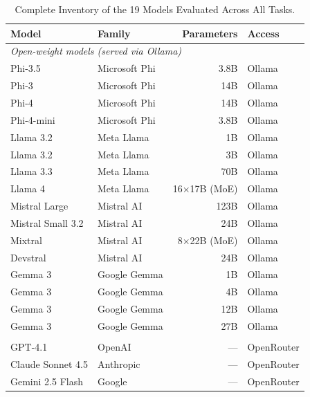 \begin{table}[htbp]
    \centering
    \caption{Complete Inventory of the 19 Models Evaluated Across All Tasks.}
    \label{tab:model_inventory}
    \footnotesize
    \begin{tabular}{llrl}
    \hline
    \textbf{Model} & \textbf{Family} & \textbf{Parameters} & \textbf{Access} \\
    \hline
    \multicolumn{4}{l}{\textit{Open-weight models (served via Ollama)}} \\
    \addlinespace[0.3em]
    Phi-3.5        & Microsoft Phi   & 3.8B         & Ollama \\
    Phi-3          & Microsoft Phi   & 14B          & Ollama \\
    Phi-4          & Microsoft Phi   & 14B          & Ollama \\
    Phi-4-mini     & Microsoft Phi   & 3.8B         & Ollama \\
    Llama 3.2      & Meta Llama      & 1B           & Ollama \\
    Llama 3.2      & Meta Llama      & 3B           & Ollama \\
    Llama 3.3      & Meta Llama      & 70B          & Ollama \\
    Llama 4        & Meta Llama      & 16$\times$17B (MoE) & Ollama \\
    Mistral Large  & Mistral AI      & 123B         & Ollama \\
    Mistral Small 3.2 & Mistral AI   & 24B          & Ollama \\
    Mixtral        & Mistral AI      & 8$\times$22B (MoE) & Ollama \\
    Devstral       & Mistral AI      & 24B          & Ollama \\
    Gemma 3        & Google Gemma    & 1B           & Ollama \\
    Gemma 3        & Google Gemma    & 4B           & Ollama \\
    Gemma 3        & Google Gemma    & 12B          & Ollama \\
    Gemma 3        & Google Gemma    & 27B          & Ollama \\
    \addlinespace[0.3em]
    \multicolumn{4}{l}{\textit{Commercial models (accessed via OpenRouter)}} \\
    \addlinespace[0.3em]
    GPT-4.1        & OpenAI          & ---          & OpenRouter \\
    Claude Sonnet 4.5 & Anthropic    & ---          & OpenRouter \\
    Gemini 2.5 Flash & Google        & ---          & OpenRouter \\
    \hline
    \end{tabular}
\end{table}




